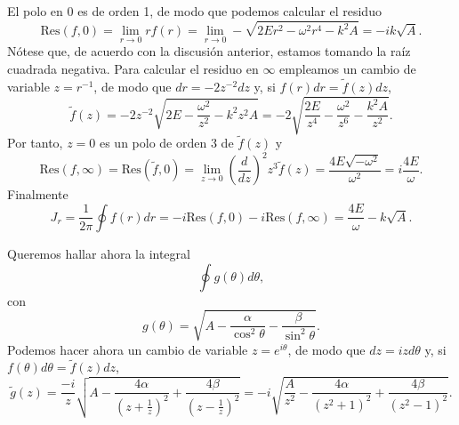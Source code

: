 \documentclass[12pt,a4paper,twoside]{article}
\theoremstyle{definition} \newtheorem{defn}[thm]{Definición}
\theoremstyle{definition} \newtheorem{ejemplo}[thm]{Ejemplo}
\theoremstyle{definition} \newtheorem{ejercicio}[thm]{Ejercicio}
\theoremstyle{remark} \newtheorem*{obs}{Observación}
\begin{document}
El polo en $0$ es de orden 1, de modo que podemos calcular el residuo
\begin{equation}
  \mathrm{Res}(f,0)=\lim_{r\rightarrow 0} rf(r)=\lim_{r\rightarrow 0}-\sqrt{2Er^2-\omega^2r^4-k^2A}=-ik\sqrt{A}.   
\end{equation}
Nótese que, de acuerdo con la discusión anterior, estamos tomando la raíz cuadrada negativa.
Para calcular el residuo en $\infty$ empleamos un cambio de variable $z=r^{-1}$, de modo que $dr=-2z^{-2}dz$ y, si $f(r)dr=\tilde{f}(z)dz$,
\begin{equation}
  \tilde{f}(z)=-2z^{-2}\sqrt{2E-\frac{\omega^2}{z^2}-k^2z^2A}=-2\sqrt{\frac{2E}{z^4}-\frac{\omega^2}{z^6}-\frac{k^2A}{z^2}}.
\end{equation}
Por tanto, $z=0$ es un polo de orden $3$ de $\tilde{f}(z)$ y
\begin{equation}
  \mathrm{Res}(f,\infty)=\mathrm{Res}(\tilde{f},0)=\lim_{z\rightarrow 0}\left( \frac{d}{d z} \right)^2 z^3 \tilde{f}(z)=\frac{4E\sqrt{-\omega^2}}{\omega^2}=i\frac{4E}{\omega}. 
\end{equation}
Finalmente
\begin{equation}
  J_r=\frac{1}{2\pi}\oint f(r)dr=-i\mathrm{Res}(f,0)-i\mathrm{Res}(f,\infty)=\frac{4E}{\omega}-k\sqrt{A}. 
\end{equation}

Queremos hallar ahora la integral
\begin{equation*}
  \oint g(\theta) d\theta,
\end{equation*}
con
\begin{equation}
  g(\theta)=\sqrt{A-\frac{\alpha}{\cos^2\theta}-\frac{\beta}{\sin^2 \theta}}.
\end{equation}
Podemos hacer ahora un cambio de variable $z=e^{i\theta}$, de modo que $dz=izd\theta$ y, si $f(\theta)d\theta=\tilde{f}(z)dz$,
\begin{equation}
  \tilde{g}(z)=\frac{-i}{z}\sqrt{ A-\frac{4\alpha}{(z+\frac{1}{z})^2}+\frac{4\beta}{(z-\frac{1}{z})^2}} = -i\sqrt{\frac{A}{z^2}-\frac{4\alpha}{(z^2+1)^2}+\frac{4\beta}{(z^2-1)^2}}.
\end{equation}
\end{document}
